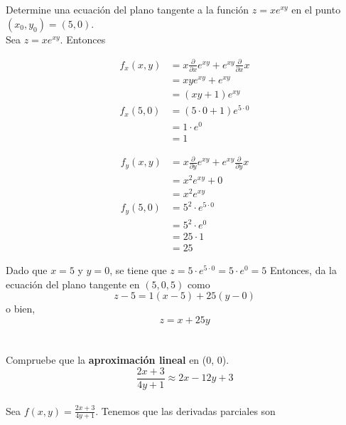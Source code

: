 \documentclass[12pt]{article}
\begin{document}
\section{}

Determine una ecuación del plano tangente a la función $z = xe^{xy}$ en el punto $(x_0, y_0) = (5, 0)$. \\

Sea $z = xe^{xy}$. Entonces

\begin{align*}
  f_x(x,y)
  &= x\frac{\partial}{\partial x}e^{xy} + e^{xy}\frac{\partial}{\partial x}x \\
  &= xye^{xy} + e^{xy} \\
  &= (xy+1)e^{xy} \\
  f_x(5,0)
  &= (5\cdot 0 + 1) e^{5\cdot 0} \\
  &= 1 \cdot e^0 \\
  &= 1
\end{align*}

\begin{align*}
  f_y(x,y)
  &= x\frac{\partial}{\partial y}e^{xy} + e^{xy}\frac{\partial}{\partial y}x \\
  &= x^2e^{xy}+0 \\
  &= x^2e^{xy} \\
  f_y(5,0)
  &= 5^2\cdot e^{5\cdot 0} \\
  &= 5^2\cdot e^0 \\
  &= 25 \cdot 1 \\
  &= 25
\end{align*}

Dado que $x=5$ y $y=0$, se tiene que $z=5\cdot e^{5\cdot 0} = 5\cdot e^0=5$
Entonces, da la ecuación del plano tangente en $(5,0,5)$ como
$$z-5=1(x-5)+25(y-0)$$
o bien,
$$z=x+25y$$

\section{}

Compruebe que la \textbf{aproximación lineal} en (0, 0).
$$\frac{2x+3}{4y +1} \approx 2x - 12y + 3$$ \\

Sea $f(x,y)=\frac{2x+3}{4y +1}$. Tenemos que las derivadas parciales son
\end{document}
